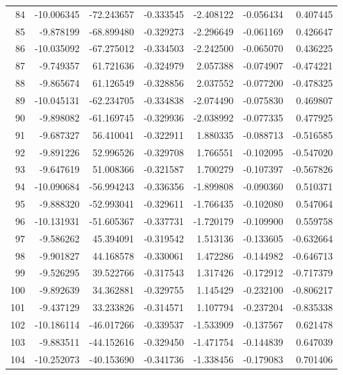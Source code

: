 \begin{tabular}{rrrrrrr}
 84 & -10.006345 &  -72.243657 & -0.333545 &  -2.408122 &  -0.056434 &  0.407445 \\
 85 &  -9.878199 &  -68.899480 & -0.329273 &  -2.296649 &  -0.061169 &  0.426647 \\
 86 & -10.035092 &  -67.275012 & -0.334503 &  -2.242500 &  -0.065070 &  0.436225 \\
 87 &  -9.749357 &   61.721636 & -0.324979 &   2.057388 &  -0.074907 & -0.474221 \\
 88 &  -9.865674 &   61.126549 & -0.328856 &   2.037552 &  -0.077200 & -0.478325 \\
 89 & -10.045131 &  -62.234705 & -0.334838 &  -2.074490 &  -0.075830 &  0.469807 \\
 90 &  -9.898082 &  -61.169745 & -0.329936 &  -2.038992 &  -0.077335 &  0.477925 \\
 91 &  -9.687327 &   56.410041 & -0.322911 &   1.880335 &  -0.088713 & -0.516585 \\
 92 &  -9.891226 &   52.996526 & -0.329708 &   1.766551 &  -0.102095 & -0.547020 \\
 93 &  -9.647619 &   51.008366 & -0.321587 &   1.700279 &  -0.107397 & -0.567826 \\
 94 & -10.090684 &  -56.994243 & -0.336356 &  -1.899808 &  -0.090360 &  0.510371 \\
 95 &  -9.888320 &  -52.993041 & -0.329611 &  -1.766435 &  -0.102080 &  0.547064 \\
 96 & -10.131931 &  -51.605367 & -0.337731 &  -1.720179 &  -0.109900 &  0.559758 \\
 97 &  -9.586262 &   45.394091 & -0.319542 &   1.513136 &  -0.133605 & -0.632664 \\
 98 &  -9.901827 &   44.168578 & -0.330061 &   1.472286 &  -0.144982 & -0.646713 \\
 99 &  -9.526295 &   39.522766 & -0.317543 &   1.317426 &  -0.172912 & -0.717379 \\
100 &  -9.892639 &   34.362881 & -0.329755 &   1.145429 &  -0.232100 & -0.806217 \\
101 &  -9.437129 &   33.233826 & -0.314571 &   1.107794 &  -0.237204 & -0.835338 \\
102 & -10.186114 &  -46.017266 & -0.339537 &  -1.533909 &  -0.137567 &  0.621478 \\
103 &  -9.883511 &  -44.152616 & -0.329450 &  -1.471754 &  -0.144839 &  0.647039 \\
104 & -10.252073 &  -40.153690 & -0.341736 &  -1.338456 &  -0.179083 &  0.701406 \\

\end{tabular}
